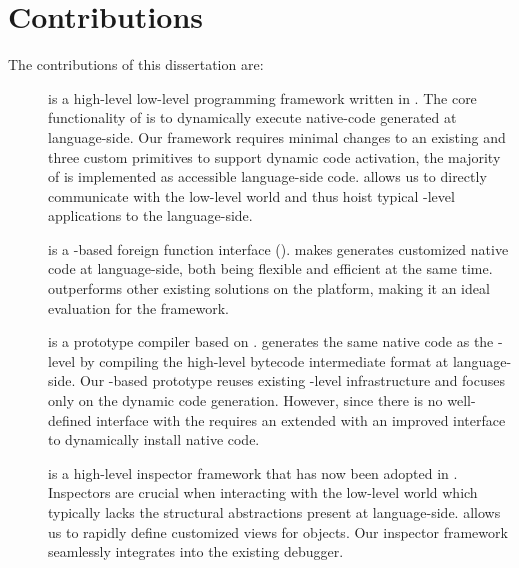 \section{Contributions}
The contributions of this dissertation are:
\begin{description}
	\item[\B] is a high-level low-level programming framework written in .
	The core functionality of \B is to dynamically execute native-code generated at language-side.
	Our framework requires minimal changes to an existing \VM and three custom primitives to support dynamic code activation, the majority of \B is implemented as accessible language-side code.
	\B allows us to directly communicate with the low-level world and thus hoist typical \VM-level applications to the language-side.
		
	\item[\NB] is a \B-based foreign function interface (\FFI).
	\NB makes generates customized native code at language-side, both being flexible and efficient at the same time.
	\NB outperforms other existing \FFI solutions on the \PH platform, making it an ideal evaluation for the \B framework.
	
	\item[\NBJ] is a prototype \JIT compiler based on \B.
	\NBJ generates the same native code as the \VM-level \JIT by compiling the high-level bytecode intermediate format at language-side.
	Our \B-based \JIT prototype reuses existing \VM-level infrastructure and focuses only on the dynamic code generation.
	However, since there is no well-defined interface with the \VM \NBJ requires an extended \VM with an improved \JIT interface to dynamically install native code.
	
	\item[\Eye] is a high-level inspector framework that has now been adopted in \PH.
	Inspectors are crucial when interacting with the low-level world which typically lacks the structural abstractions present at language-side.
	\Eye allows us to rapidly define customized views for \PH objects.
	Our inspector framework seamlessly integrates into the existing \PH debugger.
		
\end{description}


